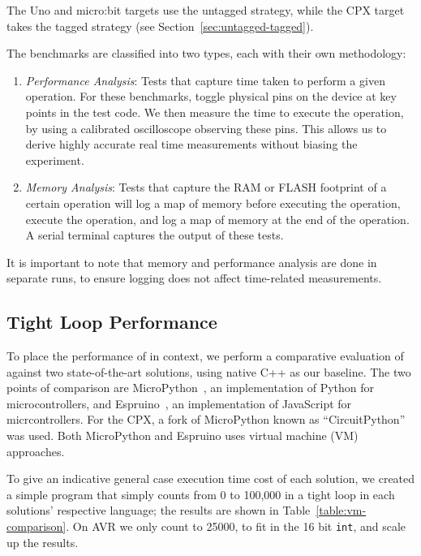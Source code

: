 The Uno and micro:bit \MC targets use the untagged strategy, while the CPX target takes the tagged strategy (see Section~\ref{sec:untagged-tagged}).

The benchmarks are classified into two types, each with their own methodology:

\begin{enumerate}
    \item \textit{Performance Analysis}: Tests that capture time taken to perform a given operation. For these benchmarks, toggle physical pins on the device at key points in 
    the test code. We then measure the time to
   execute the operation, by using a calibrated oscilloscope observing these pins. This allows us to derive highly accurate real time
   measurements without biasing the experiment.

    \item \textit{Memory Analysis}: Tests that capture the RAM or FLASH footprint of a certain operation will log a map of memory
    before executing the operation, execute the operation, and log a map of memory at the end of the operation.
    A serial terminal captures the output of these tests.
\end{enumerate}

It is important to note that memory and performance analysis are done in separate runs,
to ensure logging does not affect time-related measurements.

\subsection{Tight Loop Performance}

To place the performance of \MC in context, we perform a comparative evaluation of \MC against two state-of-the-art
solutions, using native C++ as our baseline. The two points of comparison are MicroPython~\cite{MicroPython}, an implementation
of Python for microcontrollers, and Espruino~\cite{espruinoBook}, an implementation of JavaScript for micrcontrollers.
For the CPX, a fork of MicroPython known as ``CircuitPython'' was used. Both MicroPython and Espruino uses virtual machine (VM) approaches.

To give an indicative general case execution time cost of each solution, we created a simple program that simply
counts from 0 to 100,000 in a tight loop in each solutions' respective language;
the results are shown in Table~\ref{table:vm-comparison}.
On AVR we only count to 25000, to fit in the 16 bit \texttt{int}, and scale up the results.

